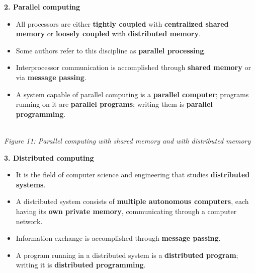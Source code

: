 \documentclass[11pt,a4paper]{article}
\newcommand{\figcap}[1]{\\[2pt]{\footnotesize\textit{#1}}}
\begin{document}
\textbf{2. Parallel computing}
\begin{itemize}
\item All processors are either \textbf{tightly coupled} with \textbf{centralized shared memory} or \textbf{loosely coupled} with \textbf{distributed memory}.
\item Some authors refer to this discipline as \textbf{parallel processing}.
\item Interprocessor communication is accomplished through \textbf{shared memory} or via \textbf{message passing}.
\item A system capable of parallel computing is a \textbf{parallel computer}; programs running on it are \textbf{parallel programs}; writing them is \textbf{parallel programming}.
\end{itemize}

\begin{center}
\figcap{Figure 11: Parallel computing with shared memory and with distributed memory}
\end{center}

\textbf{3. Distributed computing}
\begin{itemize}
\item It is the field of computer science and engineering that studies \textbf{distributed systems}.
\item A distributed system consists of \textbf{multiple autonomous computers}, each having its \textbf{own private memory}, communicating through a computer network.
\item Information exchange is accomplished through \textbf{message passing}.
\item A program running in a distributed system is a \textbf{distributed program}; writing it is \textbf{distributed programming}.
\end{itemize}
\end{document}
